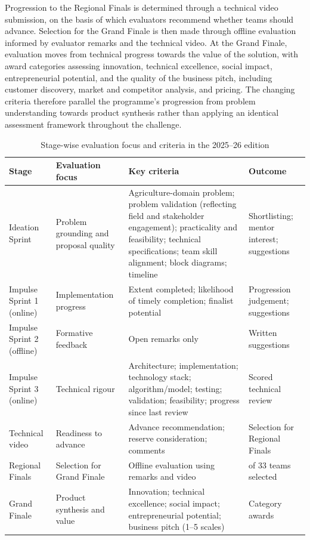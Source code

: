 \documentclass[runningheads]{llncs}
\begin{document}
Progression to the Regional Finals is determined through a technical video submission, on the basis of which evaluators recommend whether teams should advance. Selection for the Grand Finale is then made through offline evaluation informed by evaluator remarks and the technical video. At the Grand Finale, evaluation moves from technical progress towards the value of the solution, with award categories assessing innovation, technical excellence, social impact, entrepreneurial potential, and the quality of the business pitch, including customer discovery, market and competitor analysis, and pricing. The changing criteria therefore parallel the programme's progression from problem understanding towards product synthesis rather than applying an identical assessment framework throughout the challenge.

\begin{table}[htbp]
\centering
\caption{Stage-wise evaluation focus and criteria in the 2025–26 edition}
\label{tab1}
\scriptsize
\renewcommand{\arraystretch}{1.2}
\begin{tabularx}{\textwidth}{@{}>{\raggedright\arraybackslash}p{}>{\raggedright\arraybackslash}p{}>{\raggedright\arraybackslash}X>{\raggedright\arraybackslash}p{}@{}}
\toprule
\textbf{Stage} & \textbf{Evaluation focus} & \textbf{Key criteria} & \textbf{Outcome} \\
\midrule
Ideation Sprint & Problem grounding and proposal quality & Agriculture-domain problem; problem validation (reflecting field and stakeholder engagement); practicality and feasibility; technical specifications; team skill alignment; block diagrams; timeline & Shortlisting; mentor interest; suggestions \\
Impulse Sprint 1 (online) & Implementation progress & Extent completed; likelihood of timely completion; finalist potential & Progression judgement; suggestions \\
Impulse Sprint 2 (offline) & Formative feedback & Open remarks only & Written suggestions \\
Impulse Sprint 3 (online) & Technical rigour & Architecture; implementation; technology stack; algorithm/model; testing; validation; feasibility; progress since last review & Scored technical review \\
Technical video & Readiness to advance & Advance recommendation; reserve consideration; comments & Selection for Regional Finals \\
Regional Finals & Selection for Grand Finale & Offline evaluation using remarks and video & 16 of 33 teams selected \\
Grand Finale & Product synthesis and value & Innovation; technical excellence; social impact; entrepreneurial potential; business pitch (1–5 scales) & Category awards \\
\bottomrule
\end{tabularx}
\end{table}
\end{document}
